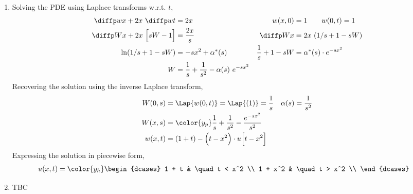 \begin{enumerate}
    \item Solving the PDE using Laplace transforms w.r.t. $ t $,
          \begin{align}
              \diffp wx + 2x\ \diffp wt        & = 2x                          &
              w(x, 0)                          & = 1 \qquad w(0, t) = 1          \\
              \diffp Wx + 2x\ \Big[sW - 1\Big] & = \frac{2x}{s}                &
              \diffp Wx                        & = 2x\ (1/s + 1 - sW)            \\
              \ln(1/s + 1 -sW)                 & = -sx^2 + \alpha^*(s)         &
              \frac{1}{s} + 1 - sW             & = \alpha^*(s) \cdot e^{-sx^2}   \\
              W                                & =
              \frac{1}{s} + \frac{1}{s^2} - \alpha(s)\ e^{-sx^2}
          \end{align}
          Recovering the solution using the inverse Laplace transform,
          \begin{align}
              W(0, s)       & = \Lap\{w(0, t)\} = \Lap\{(1)\}
              = \frac{1}{s} &
              \alpha(s)     & = \frac{1}{s^2}                           \\
              W(x, s)       & = \color{y_p} \frac{1}{s} + \frac{1}{s^2}
              - \frac{e^{-sx^2}}{s^2}                                   \\
              w(x, t)       & = (1 + t) - \Big( t - x^2 \Big)
              \cdot u \Big[ t - x^2 \Big]
          \end{align}
          Expressing the solution in piecewise form,
          \begin{align}
              u(x, t) & = \color{y_h} \begin{dcases}
                                          1 + t   & \quad t < x^2 \\
                                          1 + x^2 & \quad t > x^2 \\
                                      \end{dcases}
          \end{align}

    \item TBC


\end{enumerate}
